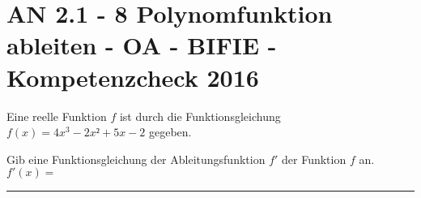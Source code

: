 \section{AN 2.1 - 8 Polynomfunktion ableiten - OA - BIFIE - Kompetenzcheck 2016}

\begin{beispiel}[AN 2.1]{1} %
				Eine reelle Funktion $f$ ist durch die Funktionsgleichung $f(x)=4x^{3}-2x²+5x-2$ gegeben.

Gib eine Funktionsgleichung der Ableitungsfunktion $f'$ der Funktion $f$ an.\\

$f'(x)=$\rule{5cm}{0.3pt}\\

\end{beispiel}	